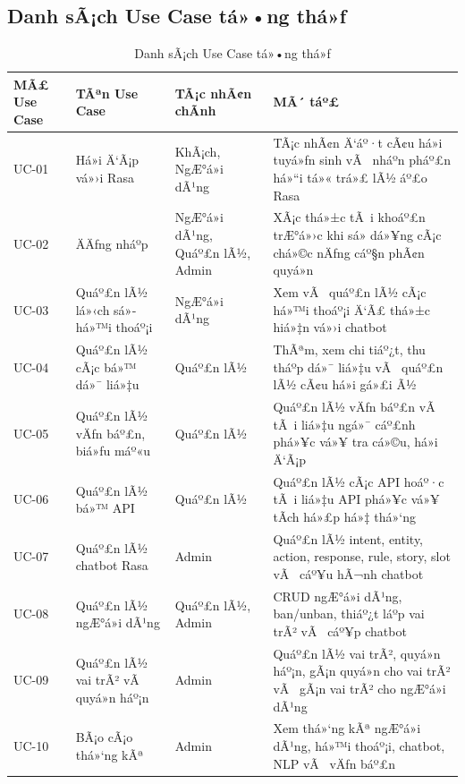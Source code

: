﻿\documentclass[12pt,a4paper]{report}
\begin{document}
\subsection{Danh sÃ¡ch Use Case tá»•ng thá»ƒ}

\begin{table}[H]
\centering
\caption{Danh sÃ¡ch Use Case tá»•ng thá»ƒ}
\label{tab:usecase_list}
\begin{tabular}{|p{1.5cm}|p{4.2cm}|p{3cm}|p{6.3cm}|}
\hline
\textbf{MÃ£ Use Case} & \textbf{TÃªn Use Case} & \textbf{TÃ¡c nhÃ¢n chÃ­nh} & \textbf{MÃ´ táº£} \\ \hline
UC-01 & Há»i Ä‘Ã¡p vá»›i Rasa & KhÃ¡ch, NgÆ°á»i dÃ¹ng & TÃ¡c nhÃ¢n Ä‘áº·t cÃ¢u há»i tuyá»ƒn sinh vÃ  nháº­n pháº£n há»“i tá»« trá»£ lÃ½ áº£o Rasa \\ \hline
UC-02 & ÄÄƒng nháº­p & NgÆ°á»i dÃ¹ng, Quáº£n lÃ½, Admin & XÃ¡c thá»±c tÃ i khoáº£n trÆ°á»›c khi sá»­ dá»¥ng cÃ¡c chá»©c nÄƒng cáº§n phÃ¢n quyá»n \\ \hline
UC-03 & Quáº£n lÃ½ lá»‹ch sá»­ há»™i thoáº¡i & NgÆ°á»i dÃ¹ng & Xem vÃ  quáº£n lÃ½ cÃ¡c há»™i thoáº¡i Ä‘Ã£ thá»±c hiá»‡n vá»›i chatbot \\ \hline
UC-04 & Quáº£n lÃ½ cÃ¡c bá»™ dá»¯ liá»‡u & Quáº£n lÃ½ & ThÃªm, xem chi tiáº¿t, thu tháº­p dá»¯ liá»‡u vÃ  quáº£n lÃ½ cÃ¢u há»i gá»£i Ã½ \\ \hline
UC-05 & Quáº£n lÃ½ vÄƒn báº£n, biá»ƒu máº«u & Quáº£n lÃ½ & Quáº£n lÃ½ vÄƒn báº£n vÃ  tÃ i liá»‡u ngá»¯ cáº£nh phá»¥c vá»¥ tra cá»©u, há»i Ä‘Ã¡p \\ \hline
UC-06 & Quáº£n lÃ½ bá»™ API & Quáº£n lÃ½ & Quáº£n lÃ½ cÃ¡c API hoáº·c tÃ i liá»‡u API phá»¥c vá»¥ tÃ­ch há»£p há»‡ thá»‘ng \\ \hline
UC-07 & Quáº£n lÃ½ chatbot Rasa & Admin & Quáº£n lÃ½ intent, entity, action, response, rule, story, slot vÃ  cáº¥u hÃ¬nh chatbot \\ \hline
UC-08 & Quáº£n lÃ½ ngÆ°á»i dÃ¹ng & Quáº£n lÃ½, Admin & CRUD ngÆ°á»i dÃ¹ng, ban/unban, thiáº¿t láº­p vai trÃ² vÃ  cáº¥p chatbot \\ \hline
UC-09 & Quáº£n lÃ½ vai trÃ² vÃ  quyá»n háº¡n & Admin & Quáº£n lÃ½ vai trÃ², quyá»n háº¡n, gÃ¡n quyá»n cho vai trÃ² vÃ  gÃ¡n vai trÃ² cho ngÆ°á»i dÃ¹ng \\ \hline
UC-10 & BÃ¡o cÃ¡o thá»‘ng kÃª & Admin & Xem thá»‘ng kÃª ngÆ°á»i dÃ¹ng, há»™i thoáº¡i, chatbot, NLP vÃ  vÄƒn báº£n \\ \hline
\end{tabular}
\end{table}
\end{document}
